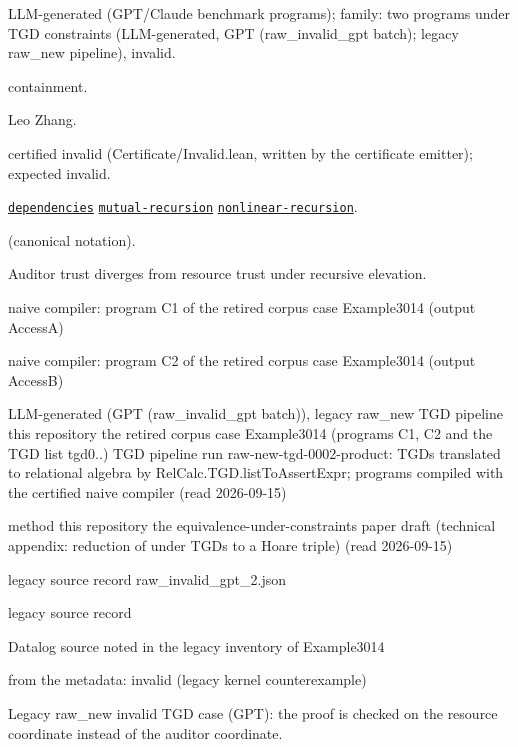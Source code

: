 \documentclass[10pt]{article}
\begin{document}
\begin{description}[leftmargin=2.6cm,style=nextline,itemsep=1pt]

\item[Category] LLM-generated (GPT/Claude benchmark programs); family: two programs under TGD constraints (LLM-generated, GPT (raw\_invalid\_gpt batch); legacy raw\_new pipeline), invalid.

\item[Kind] containment.

\item[Contributors] Leo Zhang.

\item[Status] certified invalid (Certificate/Invalid.lean, written by the certificate emitter); expected invalid.

\item[Tags] \hyperref[tag:dependencies]{\texttt{dependencies}} \hyperref[tag:mutual-recursion]{\texttt{mutual-recursion}} \hyperref[tag:nonlinear-recursion]{\texttt{nonlinear-recursion}}.

\item[Input]  (canonical notation).

\item[Summary] Auditor trust diverges from resource trust under recursive elevation.

\item[Sides] naive compiler: program C1 of the retired corpus case Example3014 (output AccessA) \par naive compiler: program C2 of the retired corpus case Example3014 (output AccessB)

\item[Sources] {\raggedright LLM-generated (GPT (raw\_invalid\_gpt batch)), legacy raw\_new TGD pipeline this repository the retired corpus case Example3014 (programs C1, C2 and the TGD list tgd0..) TGD pipeline run raw-new-tgd-0002-product: TGDs translated to relational algebra by RelCalc.TGD.listToAssertExpr; programs compiled with the certified naive compiler (read 2026-09-15) \par method this repository the equivalence-under-constraints paper draft (technical appendix: reduction of  under TGDs to a Hoare triple) (read 2026-09-15) \par legacy source record raw\_invalid\_gpt\_2.json \par legacy source record  \par Datalog source noted in the legacy inventory of Example3014\par}

\item[Obstruction note] from the metadata: invalid (legacy kernel counterexample)

\item[Note] Legacy raw\_new invalid TGD case (GPT): the proof is checked on the resource coordinate instead of the auditor coordinate.

\end{description}
\end{document}
